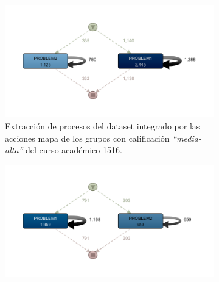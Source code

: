 \begin{figure}[H]
  \begin{subfigure}[t]{0.60\textwidth}
    \includegraphics[width=1.10\textwidth, height=0.80\textwidth]{imagenes/DISCO_map/Dataset FusionadoYear1516MidHighGrades.png}
    \caption{Extracción de procesos del dataset integrado por las acciones mapa de los grupos con calificación \emph{``media-alta''} del curso académico 1516.}
    \label{fig:mapYear1516MidHighGrades}
  \end{subfigure}
  \hfill
  \begin{subfigure}[t]{0.60\textwidth}
    \includegraphics[width=1.10\textwidth, height=0.80\textwidth]{imagenes/DISCO_map/Dataset FusionadoYear1617MidHighGrades.png}

\end{subfigure}
\end{figure}
